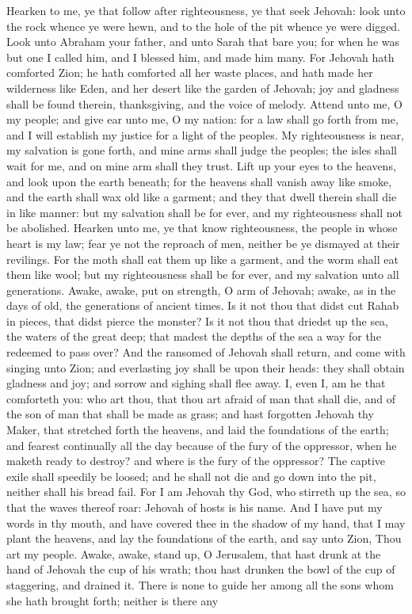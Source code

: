 Hearken to me, ye that follow after righteousness, ye that seek Jehovah: look unto the rock whence ye were hewn, and to the hole of the pit whence ye were digged. Look unto Abraham your father, and unto Sarah that bare you; for when he was but one I called him, and I blessed him, and made him many. For Jehovah hath comforted Zion; he hath comforted all her waste places, and hath made her wilderness like Eden, and her desert like the garden of Jehovah; joy and gladness shall be found therein, thanksgiving, and the voice of melody.  Attend unto me, O my people; and give ear unto me, O my nation: for a law shall go forth from me, and I will establish my justice for a light of the peoples. My righteousness is near, my salvation is gone forth, and mine arms shall judge the peoples; the isles shall wait for me, and on mine arm shall they trust. Lift up your eyes to the heavens, and look upon the earth beneath; for the heavens shall vanish away like smoke, and the earth shall wax old like a garment; and they that dwell therein shall die in like manner: but my salvation shall be for ever, and my righteousness shall not be abolished.  Hearken unto me, ye that know righteousness, the people in whose heart is my law; fear ye not the reproach of men, neither be ye dismayed at their revilings. For the moth shall eat them up like a garment, and the worm shall eat them like wool; but my righteousness shall be for ever, and my salvation unto all generations.  Awake, awake, put on strength, O arm of Jehovah; awake, as in the days of old, the generations of ancient times. Is it not thou that didst cut Rahab in pieces, that didst pierce the monster? Is it not thou that driedst up the sea, the waters of the great deep; that madest the depths of the sea a way for the redeemed to pass over? And the ransomed of Jehovah shall return, and come with singing unto Zion; and everlasting joy shall be upon their heads: they shall obtain gladness and joy; and sorrow and sighing shall flee away.  I, even I, am he that comforteth you: who art thou, that thou art afraid of man that shall die, and of the son of man that shall be made as grass; and hast forgotten Jehovah thy Maker, that stretched forth the heavens, and laid the foundations of the earth; and fearest continually all the day because of the fury of the oppressor, when he maketh ready to destroy? and where is the fury of the oppressor? The captive exile shall speedily be loosed; and he shall not die and go down into the pit, neither shall his bread fail. For I am Jehovah thy God, who stirreth up the sea, so that the waves thereof roar: Jehovah of hosts is his name. And I have put my words in thy mouth, and have covered thee in the shadow of my hand, that I may plant the heavens, and lay the foundations of the earth, and say unto Zion, Thou art my people.  Awake, awake, stand up, O Jerusalem, that hast drunk at the hand of Jehovah the cup of his wrath; thou hast drunken the bowl of the cup of staggering, and drained it. There is none to guide her among all the sons whom she hath brought forth; neither is there any 